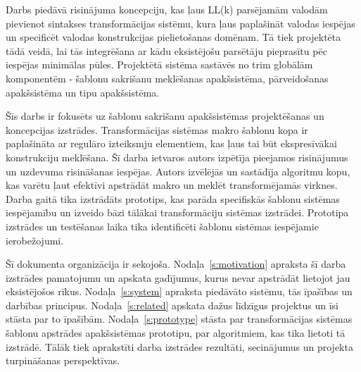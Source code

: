 Darbs piedāvā risinājuma koncepciju, kas ļaus LL(k) parsējamām valodām pievienot sintakses transformācijas sistēmu, kura ļaus paplašināt valodas iespējas un specificēt valodas konstrukcijas pielietošanas domēnam. Tā tiek projektēta tādā veidā, lai tās integrēšana ar kādu eksistējošu parsētāju pieprasītu pēc iespējas minimālas pūles. Projektētā sistēma sastāvēs no trim globālām komponentēm - šablonu sakrišanu meklēšanas apakšsistēma, pārveidošanas apakšsistēma un tipu apakšsistēma. %

Šīs darbs ir fokusēts uz šablonu sakrišanu apakšsistēmas projektēšanas un koncepcijas izstrādes. Transformācijas sistēmas makro šablonu kopa ir paplašināta ar regulāro izteiksmju elementiem, kas ļaus tai būt ekspresīvākai konstrukciju meklēšana. Šī darba ietvaros autors izpētīja pieejamos risinājumus un uzdevuma risināšanas iespējas. Autors izvēlējās un sastādīja algoritmu kopu, kas varētu ļaut efektīvi apstrādāt makro un meklēt transformējamās virknes. Darba gaitā tika izstrādāts prototips, kas parāda specifiskās šablonu sistēmas iespējamību un izveido bāzi tālākai transformāciju sistēmas izstrādei. Prototipa izstrādes un testēšanas laika tika identificēti šablonu sistēmas iespējamie ierobežojumi. 



Šī dokumenta organizācija ir sekojoša. Nodaļa~\ref{s:motivation} apraksta šī darba izstrādes pamatojumu un apskata gadījumus, kurus nevar apstrādāt lietojot jau eksistējošos rīkus. Nodaļa~\ref{s:system} apraksta piedāvāto sistēmu, tās īpašības un darbības principus. Nodaļa~\ref{s:related} apskata dažus līdzīgus projektus un īsi stāsta par to īpašībām. Nodaļa~\ref{s:prototype} stāsta par transformācijas sistēmas šablonu apstrādes apakšsistēmas prototipu, par algoritmiem, kas tika lietoti tā izstrādē. Tālāk tiek aprakstīti darba izstrādes rezultāti, secinājumus un projekta turpināšanas perspektīvas.